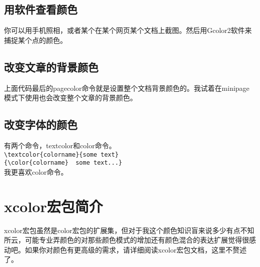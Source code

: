 \documentclass[11pt,oneside]{book}
\begin{document}
  \subsection{用软件查看颜色}
  你可以用手机照相，或者某个在某个网页某个文档上截图。然后用Gcolor2软件来捕捉某个点的颜色。

  \subsection{改变文章的背景颜色}
  上面代码最后的pagecolor命令就是设置整个文档背景颜色的。我试着在minipage模式下使用也会改变整个文章的背景颜色。


  \subsection{改变字体的颜色}
  有两个命令，textcolor和color命令。\\
  \verb+\textcolor{colorname}{some text}+\\
  \verb+{\color{colorname}  some text...}+\\
  我更喜欢color命令。


  \section{xcolor宏包简介}
  xcolor宏包虽然是color宏包的扩展集，但对于我这个颜色知识盲来说多少有点不知所云，可能专业弄颜色的对那些颜色模式的增加还有颜色混合的表达扩展觉得很感动吧。如果你对颜色有更高级的需求，请详细阅读xcolor宏包文档，这里不赘述了。
\end{document}
